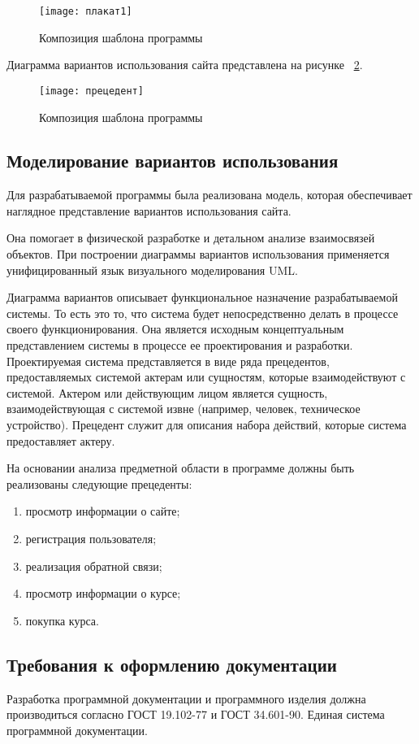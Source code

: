 \begin{figure}[ht]
	\texttt{[image: плакат1]}
	\caption{Композиция шаблона программы}
	\label{плакат1:image}
\end{figure}

Диаграмма вариантов использования сайта представлена на рисунке ~\ref{прецедент:image}.

\begin{figure}[ht]
	\texttt{[image: прецедент]}
	\caption{Композиция шаблона программы}
	\label{прецедент:image}
\end{figure}

\subsection{Моделирование вариантов использования}

Для разрабатываемой программы была реализована модель, которая обеспечивает наглядное представление вариантов использования сайта.

Она помогает в физической разработке и детальном анализе взаимосвязей объектов. При построении диаграммы вариантов использования применяется унифицированный язык визуального моделирования UML.

Диаграмма вариантов описывает функциональное назначение разрабатываемой системы. То есть это то, что система будет непосредственно делать в процессе своего функционирования. Она является исходным концептуальным представлением системы в процессе ее проектирования и разработки. Проектируемая система представляется в виде ряда прецедентов, предоставляемых системой актерам или сущностям, которые взаимодействуют с системой. Актером или действующим лицом является сущность, взаимодействующая с системой извне (например, человек, техническое устройство). Прецедент служит для описания набора действий, которые система предоставляет актеру.

На основании анализа предметной области в программе должны быть реализованы следующие прецеденты:
\begin{enumerate}
	\item просмотр информации о сайте;
	\item регистрация пользователя;
	\item реализация обратной связи;
	\item просмотр информации о курсе;
	\item покупка курса.
\end{enumerate}

\subsection{Требования к оформлению документации}

Разработка программной документации и программного изделия должна производиться согласно ГОСТ 19.102-77 и ГОСТ 34.601-90. Единая система программной документации.
